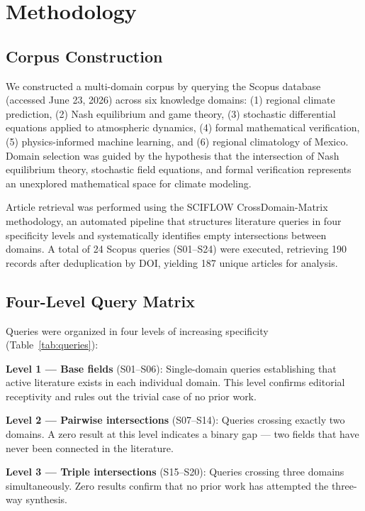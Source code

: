 \documentclass[gmd, manuscript]{copernicus}
\begin{document}
\section{Methodology}

\subsection{Corpus Construction}

We constructed a multi-domain corpus by querying the Scopus database
(accessed June 23, 2026) across six knowledge domains: (1) regional
climate prediction, (2) Nash equilibrium and game theory, (3) stochastic
differential equations applied to atmospheric dynamics, (4) formal
mathematical verification, (5) physics-informed machine learning, and
(6) regional climatology of Mexico. Domain selection was guided by the
hypothesis that the intersection of Nash equilibrium theory, stochastic
field equations, and formal verification represents an unexplored
mathematical space for climate modeling.

Article retrieval was performed using the SCIFLOW CrossDomain-Matrix
methodology, an automated pipeline that structures literature queries in
four specificity levels and systematically identifies empty intersections
between domains. A total of 24 Scopus queries (S01--S24) were executed,
retrieving 190 records after deduplication by DOI, yielding 187 unique
articles for analysis.

\subsection{Four-Level Query Matrix}

Queries were organized in four levels of increasing specificity
(Table~\ref{tab:queries}):

\textbf{Level 1 — Base fields} (S01--S06): Single-domain queries
establishing that active literature exists in each individual domain.
This level confirms editorial receptivity and rules out the trivial
case of no prior work.

\textbf{Level 2 — Pairwise intersections} (S07--S14): Queries crossing
exactly two domains. A zero result at this level indicates a binary gap
— two fields that have never been connected in the literature.

\textbf{Level 3 — Triple intersections} (S15--S20): Queries crossing
three domains simultaneously. Zero results confirm that no prior work
has attempted the three-way synthesis.
\end{document}
